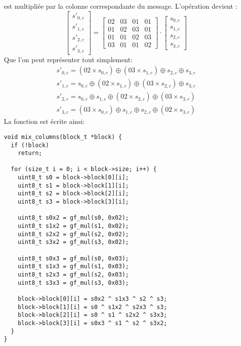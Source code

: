 \documentclass[a4paper, 10pt]{article}
\begin{document}
  est multipliée par la colonne correspondante du message.
  L'opération devient :
  \[
    \begin{bmatrix}
      s'_{0,c}\\
      s'_{1,c}\\
      s'_{2,c}\\
      s'_{3,c}
    \end{bmatrix}
    =
    \begin{bmatrix}
      02&03&01&01\\
      01&02&03&01\\
      01&01&02&03\\
      03&01&01&02
    \end{bmatrix}
    \cdot 
    \begin{bmatrix}
      s_{0,c}\\
      s_{1,c}\\
      s_{2,c}\\
      s_{3,c}
    \end{bmatrix}
  \]
  Que l’on peut représenter tout simplement:
  \begin{align*}
    s'_{0,c} = ({02} \times s_{0,c}) \oplus ({03} \times s_{1,c}) \oplus s_{2,c} \oplus s_{3,c} \\
    s'_{1,c} = s_{0,c} \oplus ({02} \times s_{1,c}) \oplus ({03} \times s_{2,c}) \oplus s_{3,c} \\
    s'_{2,c} = s_{0,c} \oplus s_{1,c} \oplus ({02} \times s_{2,c}) \oplus ({03} \times s_{3,c}) \\
    s'_{3,c} = ({03} \times s_{0,c}) \oplus s_{1,c} \oplus s_{2,c} \oplus ({02} \times s_{3,c})    
  \end{align*}
  La fonction est écrite ainsi:
  \small{
    \begin{verbatim}
void mix_columns(block_t *block) {
  if (!block)
    return;

  for (size_t i = 0; i < block->size; i++) {
    uint8_t s0 = block->block[0][i];
    uint8_t s1 = block->block[1][i];
    uint8_t s2 = block->block[2][i];
    uint8_t s3 = block->block[3][i];

    uint8_t s0x2 = gf_mul(s0, 0x02);
    uint8_t s1x2 = gf_mul(s1, 0x02);
    uint8_t s2x2 = gf_mul(s2, 0x02);
    uint8_t s3x2 = gf_mul(s3, 0x02);

    uint8_t s0x3 = gf_mul(s0, 0x03);
    uint8_t s1x3 = gf_mul(s1, 0x03);
    uint8_t s2x3 = gf_mul(s2, 0x03);
    uint8_t s3x3 = gf_mul(s3, 0x03);

    block->block[0][i] = s0x2 ^ s1x3 ^ s2 ^ s3;
    block->block[1][i] = s0 ^ s1x2 ^ s2x3 ^ s3;
    block->block[2][i] = s0 ^ s1 ^ s2x2 ^ s3x3;
    block->block[3][i] = s0x3 ^ s1 ^ s2 ^ s3x2;
  }
}
    \end{verbatim}
  }
\end{document}
